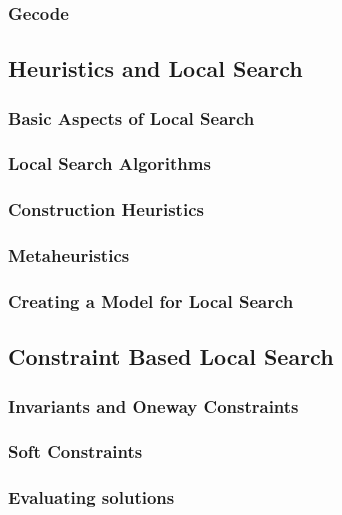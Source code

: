 \documentclass[a4paper,11pt]{article}
\begin{document}
    \subsubsection{Gecode}
    
  \subsection{Heuristics and Local Search}
  
     \subsubsection{Basic Aspects of Local Search}
    
    \subsubsection{Local Search Algorithms}
    
    \subsubsection{Construction Heuristics}
    
    \subsubsection{Metaheuristics}
    
    \subsubsection{Creating a Model for Local Search}
    
  \subsection{Constraint Based Local Search}
  
    \subsubsection{Invariants and Oneway Constraints}
    
    \subsubsection{Soft Constraints}
    
    \subsubsection{Evaluating solutions}
    
\end{document}
